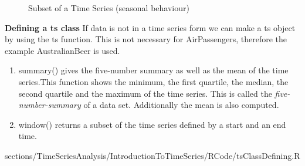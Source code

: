 {{\begin{figure}[H]
	\caption{Subset of a Time Series (seasonal behaviour)}
\end{figure}
\RTheory
{
\textbf{Defining a {\color{blue}ts} class}\vfill
If data is not in a time series form we can make a {\color{blue}ts} object by using the {\color{blue}ts}  function. This is not necessary for AirPassengers, therefore the example AustralianBeer is used.
\begin{enumerate}
	\item  {\color{blue}summary()} gives the five-number summary as well as the mean of the time series.This function shows the minimum, the first quartile, the median, the second quartile and the maximum of the time series. This is called the \textit{five-number-summary} of a data set. Additionally the mean is also computed.
	\item  {\color{blue}window()} returns a subset of the time series defined by a start and an end time.
\end{enumerate}
}
{sections/TimeSeriesAnalysis/IntroductionToTimeSeries/RCode/tsClassDefining.R}

}



}